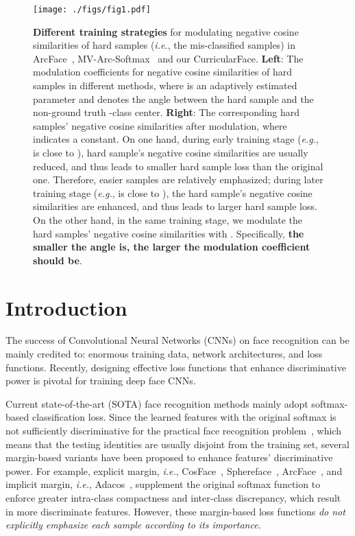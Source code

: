 \documentclass[10pt,twocolumn,letterpaper]{article}
\def\figvspace{{\vspace{-2mm}}}
\begin{document}
\begin{figure}[t]
  \centering
  \texttt{[image: ./figs/fig1.pdf]}
\caption{\small
  \textbf{Different training strategies} for modulating negative cosine similarities of hard samples (\textit{i.e.}, the mis-classified samples) in ArcFace~\cite{deng2018arcface}, MV-Arc-Softmax~\cite{wang2018support} and our CurricularFace.
  \textbf{Left}: The modulation coefficients  for negative cosine similarities of hard samples in different methods, where  is an adaptively estimated parameter and  denotes the angle between the hard sample and the non-ground truth -class center.
  \textbf{Right}: The corresponding hard samples' negative cosine similarities  after modulation, where  indicates a constant.
  On one hand, during early training stage (\textit{e.g.},  is close to ), hard sample's negative cosine similarities are usually reduced, and thus leads to smaller hard sample loss than the original one. Therefore, easier samples are relatively emphasized; during later training stage (\textit{e.g.},  is close to ), the hard sample's negative cosine similarities are enhanced, and thus leads to larger hard sample loss.
  On the other hand, in the same training stage, we modulate the hard samples' negative cosine similarities with .
  Specifically, \textbf{the smaller the angle  is, the larger the modulation coefficient should be}.
  }
  \label{fig:hard_sample_weight}
  \figvspace
\end{figure}

\section{Introduction}
The success of Convolutional Neural Networks (CNNs) on face recognition can be mainly credited to: enormous training data, network architectures, and loss functions.
Recently, designing effective loss functions that enhance discriminative power is pivotal for training deep face CNNs.

Current state-of-the-art (SOTA) face recognition methods mainly adopt softmax-based classification loss.
Since the learned features with the original softmax is not sufficiently discriminative for the practical face recognition problem~\cite{liu2017sphereface}, which means that the testing identities are usually disjoint from the training set, several margin-based variants have been proposed to enhance features' discriminative power.
For example, explicit margin, \textit{i.e.},  CosFace~\cite{wang2018cosface}, Sphereface~\cite{liu2017sphereface}, ArcFace~\cite{deng2018arcface}, and implicit margin, \textit{i.e.}, Adacos~\cite{zhang2019adacos}, supplement the original softmax function to enforce greater intra-class compactness and inter-class discrepancy, which result in more discriminate features.
However, these margin-based loss functions \textit{do not explicitly emphasize each sample according to its importance}.
\end{document}
